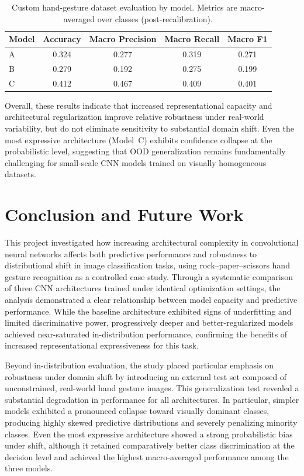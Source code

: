 \documentclass{article}
\begin{document}
\begin{table}[H]
\centering
\caption{Custom hand-gesture dataset evaluation by model. Metrics are macro-averaged over classes (post-recalibration).}
\label{tab:custom_eval_metrics}
\begin{tabular}{lcccc}
\hline
Model & Accuracy & Macro Precision & Macro Recall & Macro F1 \\
\hline
A & 0.324 & 0.277 & 0.319 & 0.271 \\
B & 0.279 & 0.192 & 0.275 & 0.199 \\
C & 0.412 & 0.467 & 0.409 & 0.401 \\
\hline
\end{tabular}
\end{table}


Overall, these results indicate that increased representational capacity 
and architectural regularization improve relative robustness under 
real-world variability, but do not eliminate sensitivity to substantial 
domain shift. Even the most expressive architecture (Model~C) exhibits 
confidence collapse at the probabilistic level, suggesting that OOD 
generalization remains fundamentally challenging for small-scale CNN 
models trained on visually homogeneous datasets.

\section{Conclusion and Future Work}

This project investigated how increasing architectural complexity in
convolutional neural networks affects both predictive performance and
robustness to distributional shift in image classification tasks, using
rock--paper--scissors hand gesture recognition as a controlled case study.
Through a systematic comparison of three CNN architectures trained under
identical optimization settings, the analysis demonstrated a clear
relationship between model capacity and predictive performance.
While the baseline architecture exhibited signs of underfitting and limited
discriminative power, progressively deeper and better-regularized models
achieved near-saturated in-distribution performance, confirming the benefits
of increased representational expressiveness for this task.

Beyond in-distribution evaluation, the study placed particular emphasis
on robustness under domain shift by introducing an external test set
composed of unconstrained, real-world hand gesture images.
This generalization test revealed a substantial degradation in performance
for all architectures. In particular, simpler models exhibited a pronounced
collapse toward visually dominant classes, producing highly skewed predictive
distributions and severely penalizing minority classes. Even the most
expressive architecture showed a strong probabilistic bias under shift,
although it retained comparatively better class discrimination at the
decision level and achieved the highest macro-averaged performance among
the three models.
\end{document}
